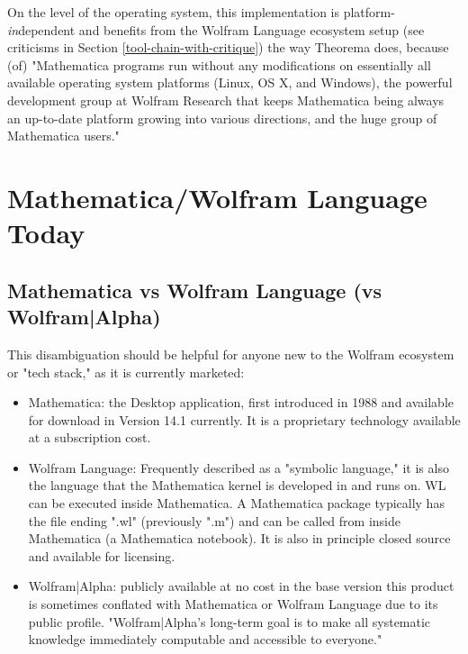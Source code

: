 On the level of the operating system, this implementation is platform-\textit{in}dependent and benefits from the Wolfram Language ecosystem setup (see criticisms in Section \ref{tool-chain-with-critique}) the way Theorema does, because (of) "Mathematica programs run without any modifications on essentially all available operating system platforms (Linux, OS X, and Windows), the powerful development group at Wolfram Research that keeps Mathematica being always an up-to-date platform growing into various directions, and the huge group of Mathematica users." \cite[p. 72]{windsteiger_theorema_2013}

\section{Mathematica/Wolfram Language Today}

\subsection{Mathematica vs Wolfram Language (vs Wolfram|Alpha)} \label{mm-vs-wl}

This disambiguation should be helpful for anyone new to the Wolfram ecosystem or "tech stack," as it is currently marketed: \cite{noauthor_wolfram_nodate}

\begin{itemize}
    \item Mathematica: the Desktop application, first introduced in 1988 and available for download in Version 14.1 currently. It is a proprietary technology available at a subscription cost. \cite{noauthor_wolfram_nodate-1}
    \item Wolfram Language: Frequently described as a "symbolic language," it is also the language that the Mathematica kernel is developed in and runs on. WL can be executed inside Mathematica. A Mathematica package typically has the file ending ".wl" (previously ".m") and can be called from inside Mathematica (a Mathematica notebook). It is also in principle closed source \cite{noauthor_wolfram_nodate} and available for licensing.
    \item Wolfram|Alpha: publicly available at no cost in the base version \cite{noauthor_wolframalpha_nodate} this product is sometimes conflated with Mathematica or Wolfram Language due to its public profile. "Wolfram|Alpha's long-term goal is to make all systematic knowledge immediately computable and accessible to everyone." \cite{wolfram_research_inc_about_2024}
\end{itemize}

